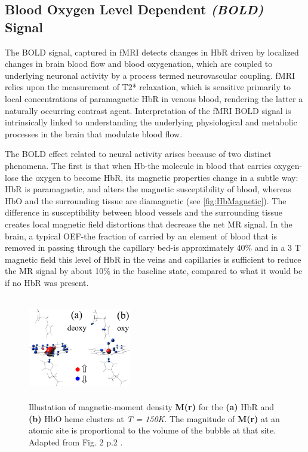 \subsection{Blood Oxygen Level Dependent \textit{(BOLD)} Signal}

The \gls{BOLD} signal, captured in \gls{fMRI} detects changes in \gls{HbR} driven by localized changes in brain blood flow and blood oxygenation, which are coupled to underlying neuronal activity by a process termed neurovascular coupling. \gls{fMRI} relies upon the measurement of T2* relaxation, which is sensitive primarily to local concentrations of paramagnetic \gls{HbR} in venous blood, rendering the latter a naturally occurring contrast agent. Interpretation of the \gls{fMRI} \gls{BOLD} signal is intrinsically linked to understanding the underlying physiological and metabolic processes in the brain that modulate blood flow.

The \gls{BOLD} effect related to neural activity arises because of two distinct phenomena. The first is that when \gls{Hb}-the molecule in blood that carries oxygen-lose the oxygen to become \gls{HbR}, its magnetic properties change in a subtle way: \gls{HbR} is paramagnetic, and alters the magnetic susceptibility of blood, whereas \gls{HbO} and the surrounding tissue  are diamagnetic (see \autoref{fig:HbMagnetic}). The difference in susceptibility between blood vessels and the surrounding tissue creates local magnetic field distortions that decrease the net \gls{MR} signal. In the brain, a typical \gls{OEF}-the fraction of  carried by an element of blood that is removed in passing through the capillary bed-is approximately 40\% and in a 3 T magnetic field this level of \gls{HbR} in the veins and capillaries is sufficient to reduce the \gls{MR} signal by about 10\% in the baseline state, compared to what it would be if no \gls{HbR} was present. 

\begin{figure}
   \centering
   \includegraphics[width = 0.4\textwidth, height = 4.5cm]{assets/images/DeoxyHb_magnetic.jpg}
   \caption[Oxy- and Deoxy-hemoglobin Magnetic Moment Density]{Illustation of magnetic-moment density \textbf{M(r)} for the \textbf{(a)} \gls{HbR} and \textbf{(b)} \gls{HbO} heme clusters at \textit{T = 150K}. The magnitude of \textbf{M(r)} at an atomic site is proportional to the volume of the bubble at that site. Adapted from Fig. 2 p.2 .}
   \label{fig:HbMagnetic}
\end{figure}

